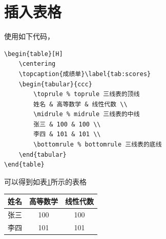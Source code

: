 \section{插入表格}
使用如下代码，
\begin{verbatim}
\begin{table}[H]
	\centering
	\topcaption{成绩单}\label{tab:scores}
	\begin{tabular}{ccc}
		\toprule % toprule 三线表的顶线
		姓名 & 高等数学 & 线性代数 \\
		\midrule % midrule 三线表的中线
		张三 & 100 & 100 \\
		李四 & 101 & 101 \\
		\bottomrule % bottomrule 三线表的底线
	\end{tabular}
\end{table}
\end{verbatim}
可以得到如表\ref{tab:scores}所示的表格
\begin{table}[H]
\centering
{}\label{tab:scores}
\begin{tabular}{ccc}
	\toprule 
	姓名 & 高等数学 & 线性代数 \\
	\midrule
	张三 & 100 & 100 \\
	李四 & 101 & 101 \\
	\bottomrule
\end{tabular}
\end{table}
